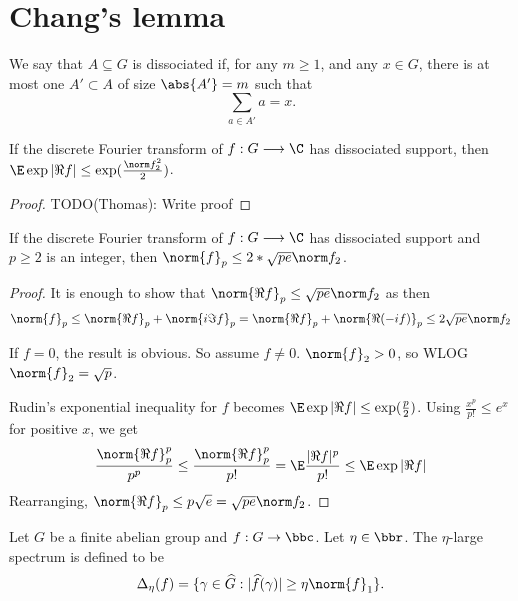 \chapter{Chang's lemma}

\begin{definition}[Dissociation]
\label{dissociated}
\leanok
We say that $A\subseteq G$ is dissociated if, for any $m\geq 1$, and any $x\in G$, there is at most one $A'\subset A$ of size $\abs{A'}=m$ such that
\[\sum_{a\in A'}a=x.\]
\end{definition}


\begin{lemma}
\label{rudin_exp}
\leanok
If the discrete Fourier transform of $f : G \longrightarrow \C$ has dissociated support, then $\E \exp|\Re f| \le \exp(\frac{\norm f_2^2} 2)$.
\end{lemma}
\begin{proof}
TODO(Thomas): Write proof
\end{proof}


\begin{lemma}
\label{rudin}
\leanok
If the discrete Fourier transform of $f : G \longrightarrow \C$ has dissociated support and $p \ge 2$ is an integer, then $\norm{f}_p \le 2 * \sqrt{pe} \norm f_2$.
\end{lemma}
\begin{proof}
\leanok
It is enough to show that $\norm{\Re f}_p \le \sqrt{pe} \norm f_2$ as then
$$\norm{f}_p \le \norm{\Re f}_p + \norm{i \Im f}_p = \norm{\Re f}_p + \norm{\Re (-if)}_p \le 2 \sqrt{pe} \norm f_2$$

If $f = 0$, the result is obvious. So assume $f \ne 0$. $\norm{f}_2 > 0$, so WLOG $\norm{f}_2 = \sqrt p$.

Rudin's exponential inequality for $f$ becomes $\E \exp|\Re f| \le \exp(\frac p 2)$. Using $\frac{x^p}{p!} \le e^x$ for positive $x$, we get
$$\frac{\norm{\Re f}_p^p}{p^p} \le \frac{\norm{\Re f}_p^p}{p!} = \E \frac{|\Re f|^p}{p!} \le \E \exp|\Re f|$$
Rearranging, $\norm{\Re f}_p \le p\sqrt{e} = \sqrt{pe} \norm f_2$.
\end{proof}


\begin{definition}
\label{large_spec}
\leanok
Let $G$ be a finite abelian group and $f:G\to\bbc$. Let $\eta\in \bbr$. The $\eta$-large spectrum is defined to be
\[\Delta_\eta(f) = \{ \gamma\in\widehat{G} : \lvert \widehat{f}(\gamma)\rvert \geq \eta\norm{f}_1\}.\]
\end{definition}


